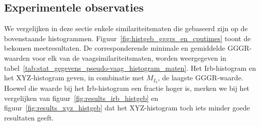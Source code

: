 \subsection{Experimentele observaties}
\label{sectie:histogrammen_experimentele_observaties}

We vergelijken in deze sectie enkele similariteitsmaten die gebaseerd zijn op de bovenstaande
histogrammen. 
Figuur~\ref{fig:histgeb_gggrs_en_cputimes} toont de bekomen meetresultaten. 
De corresponderende minimale en gemiddelde GGGR-waarden voor elk van de
vaagsimilariteitsmaten, worden weergegeven in 
tabel~\ref{tab:stat_gegevens_pseudo-vaag_histogram_maten}. Het Irb-histogram
en het XYZ-histogram geven, in combinatie met $M_{I_3}$, de laagste GGGR-waarde. Hoewel die
waarde bij het Irb-histogram een fractie hoger is, merken we bij het vergelijken van 
figuur~\ref{fig:results_irb_histgeb} en figuur~\ref{fig:results_xyz_histgeb} dat het 
XYZ-histogram toch iets minder goede resultaten geeft. 

